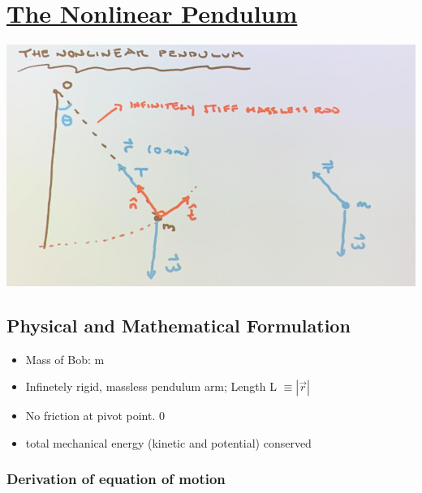 \def \secname {The Nonlinear Pendulum}

\section[\secname]{\hyperlink{toc}{\secname}}

\includegraphics[width = 0.75 \linewidth]{Images/410_pendulumnonlinear.png}

\subsection{Physical and Mathematical Formulation}
\begin{itemize}
    \item Mass of Bob: m
    \item Infinetely rigid, massless pendulum arm; Length L $\equiv |\vec{r}|$
    \item No friction at pivot point. 0
    \item total mechanical energy (kinetic and potential) conserved
\end{itemize}
\subsubsection{Derivation of equation of motion}

